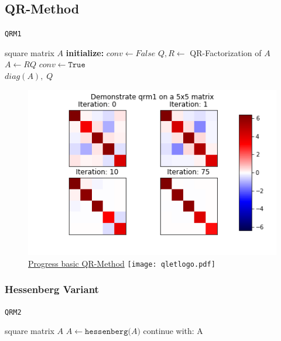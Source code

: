\documentclass[12pt]{article}
\begin{document}
\subsection{QR-Method}

\begin{algorithm}
\caption{\texttt{QRM1}}
\label{qr1-meth}
  \begin{algorithmic}[1]
    \Require square matrix $A$
    \Statex \textbf{initialize: } $conv \gets False$
      \State $Q, R \gets$ QR-Factorization of $A$
      \State $A \gets RQ$
        \State $conv \gets \texttt{True}$
        \Statex
      \EndIf
    \EndWhile\\
    \Return $diag\left(A\right),\; Q$
  \end{algorithmic}
\end{algorithm}

\begin{figure}
\begin{center}
\caption{\href {https://github.com/thsis/NIS18/tree/master/media/plots}{Progress basic QR-Method}  \protect\texttt{[image: qletlogo.pdf]}}
  \includegraphics[scale=0.6]{../media/plots/qrm1.png}
\end{center}
\end{figure}


\subsubsection{Hessenberg Variant}


\begin{algorithm}
\caption{\texttt{QRM2}}
\label{qr2-meth}
\begin{algorithmic}[1]
  \Require square matrix $A$
  \State $A \gets \texttt{hessenberg(}A\texttt{)}$
  \State continue with:  A
\end{algorithmic}
\end{algorithm}
\end{document}
